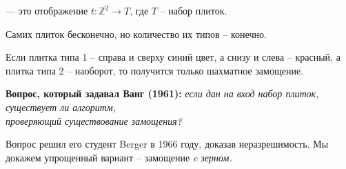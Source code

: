 \begin{defn}[Замощение]
     --- это отображение $ t\colon  \mathbb{Z}^2 \to T $, где $ T $ -- набор плиток.
\end{defn}

\begin{note}
    Самих плиток бесконечно, но количество их типов -- конечно.
\end{note}

\begin{ex}
    Если плитка типа 1 -- справа и сверху синий цвет, а снизу и слева -- красный, а плитка типа 2 -- наоборот, то получится только шахматное замощение.
\end{ex}

\noindent \textbf{Вопрос, который задавал Ванг (1961):}
\textit{если дан на вход набор плиток, существует ли алгоритм, \\
проверяющий существование замощения?}

Вопрос решил его студент Berger в 1966 году, доказав неразрешимость.
Мы докажем упрощенный вариант -- замощение \textit{c зерном.}

